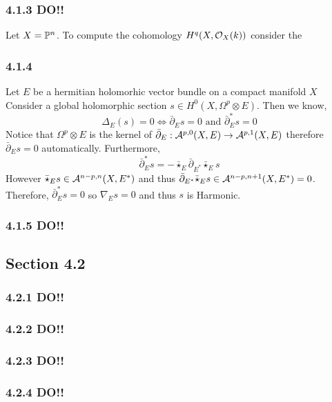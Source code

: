 \documentclass[12pt]{article}
\begin{document}
\subsubsection{4.1.3 DO!!}

Let $X = \P^n$.
To compute the cohomology $H^q(X, \struct{X}(k))$ consider the  

\subsubsection{4.1.4}

Let $E$ be a hermitian holomorhic vector bundle on a compact \kahler manifold $X$ Consider a global holomorphic section $s \in H^0(X, \Omega^p \otimes E)$. Then we know,
\[ \Delta_E(s) = 0 \iff \bar{\partial}_E s = 0 \text{ and } \bar{\partial}_E^* s = 0 \]
Notice that $\Omega^p \otimes E$ is the kernel of $\bar{\partial}_E : \A^{p,0}(X, E) \to \A^{p, 1}(X, E)$ therefore $\bar{\partial}_E s = 0$ automatically. Furthermore, 
\[ \bar{\partial}^*_E s = - \bar{\star}_E \bar{\partial}_{E^*} \bar{\star}_E s \]
However $\bar{\star}_E s \in \A^{n-p,n}(X, E^*)$ and thus $\bar{\partial}_{E^*} \bar{\star}_E s \in \A^{n-p,n+1}(X, E^*) = 0$. Therefore, $\bar{\partial}^*_E s = 0$ so $\nabla_E s = 0$ and thus $s$ is Harmonic.

\subsubsection{4.1.5 DO!!}

\subsection{Section 4.2}

\subsubsection{4.2.1 DO!!}

\subsubsection{4.2.2 DO!!}

\subsubsection{4.2.3 DO!!}

\subsubsection{4.2.4 DO!!}
\end{document}
